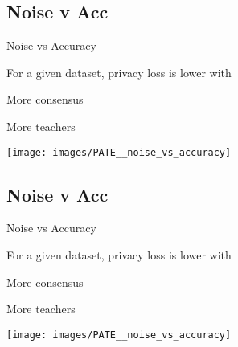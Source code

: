 \documentclass[xor=table]{beamer}
\let\svpar\par
\let\svitemize\itemize
\let\svenditemize\enditemize
\let\svitem\item
\let\svcenter\center
\let\svendcenter\endcenter
\let\svcolumn\column
\let\svendcolumn\endcolumn
\newcommand\stretchoff{%
  \let\par\svpar%
  \let\item\svitem%
  \let\itemize\svitemize%
  \let\enditemize\svenditemize%
  \let\center\svcenter%
  \let\endcenter\svendcenter%
  \let\column\svcolumn%
  \let\endcolumn\svendcolumn%
}
\begin{document}
\subsection*{Noise v Acc}
\stretchoff
\begin{frame}{Noise vs Accuracy}

 \begin{multicols}{2}
For a given dataset, privacy loss is lower with
	\begin{itemize}
	\item More consensus
	\item More teachers

	\end{itemize}
\columnbreak
	\begin{center}
	\texttt{[image: images/PATE\_\_noise\_vs\_accuracy]}
	\end{center}

\end{multicols}
\end{frame}






\subsection*{Noise v Acc}
\stretchoff
\begin{frame}{Noise vs Accuracy}

 \begin{multicols}{2}
For a given dataset, privacy loss is lower with
	\begin{itemize}
	\item More consensus
	\item More teachers

	\end{itemize}
\columnbreak
	\begin{center}
	\texttt{[image: images/PATE\_\_noise\_vs\_accuracy]}
	\end{center}
\end{multicols}

\end{frame}
\end{document}
